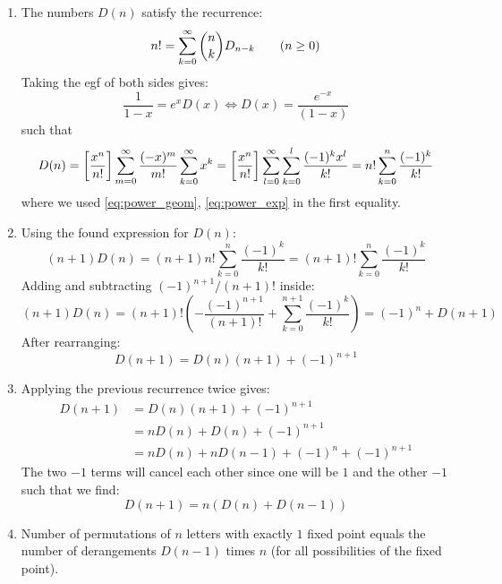 \begin{solution}
    \begin{enumerate}[label=(\alph*)]
        \item \hypertarget{eq:ch2:27:a}{} The numbers $D(n)$ satisfy the recurrence:
        \[
            n! = \bsum[k] \binom{n}{k} D_{n-k} \qquad(n\geq0)
        \]
        Taking the egf of both sides gives:
        \[
            \frac{1}{1-x} = e^xD(x) \Longleftrightarrow D(x) = \frac{e^{-x}}{(1-x)}
        \]
        such that
        \[
            D(n) = \coeff{\frac{x^n}{n!}} \bsum[m] \frac{(-x)^m}{m!} \bsum[k] x^k = \coeff{\frac{x^n}{n!}}\sum_{l=0}^\infty\sum_{k=0}^l  \frac{(-1)^kx^{l}}{k!} = n! \sum_{k=0}^n \frac{(-1)^k}{k!}
        \]
        where we used \eqref{eq:power_geom}, \eqref{eq:power_exp} in the first equality.
        \item \hypertarget{eq:ch2:27:b}{} Using the found expression for $D(n)$:
        \[
            (n+1)D(n) = (n+1)n!\sum_{k=0}^n \frac{(-1)^k}{k!}
            = (n+1)!\sum_{k=0}^n \frac{(-1)^k}{k!}
        \]
        Adding and subtracting $(-1)^{n+1}/(n+1)!$ inside:
        \[
            (n+1)D(n) = (n+1)! \left(-\frac{(-1)^{n+1}}{(n+1)!} + \sum_{k=0}^{n+1} \frac{(-1)^k}{k!}\right) = (-1)^{n} + D(n+1)
        \]
        After rearranging:
        \[
            D(n+1) = D(n)(n+1) + (-1)^{n+1}
        \]

        \item Applying the previous recurrence twice gives:
        \begin{align*}
            D(n+1) &= D(n)(n+1) + (-1)^{n+1} \\
            &= nD(n) + D(n) + (-1)^{n+1} \\
            &= nD(n) + nD(n-1) + (-1)^{n} + (-1)^{n+1}
        \end{align*}
        The two $-1$ terms will cancel each other since one will be $1$ and the other $-1$ such that we find:
        \[
            D(n+1) = n(D(n) + D(n-1))
        \]
        \item Number of permutations of $n$ letters with exactly $1$ fixed point equals the number of derangements $D(n-1)$ times $n$ (for all possibilities of the fixed point).
        

\end{enumerate}
\end{solution}
